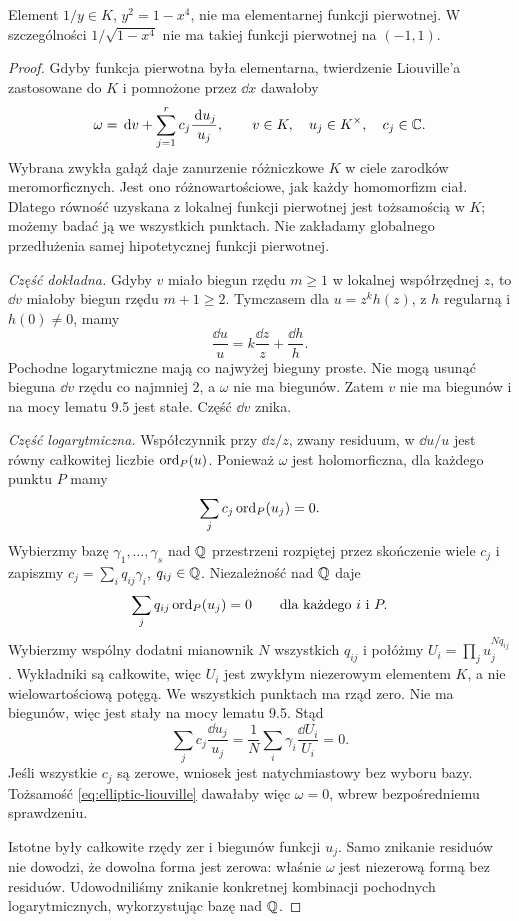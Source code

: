 \begin{twierdzenie}
Element $1/y\in K$, $y^2=1-x^4$, nie ma elementarnej funkcji pierwotnej. W szczególności $1/\sqrt{1-x^4}$ nie ma takiej funkcji pierwotnej na $(-1,1)$.
\end{twierdzenie}
\begin{proof}
Gdyby funkcja pierwotna była elementarna, twierdzenie Liouville'a zastosowane do $K$ i pomnożone przez $\dd x$ dawałoby
\begin{equation}\label{eq:elliptic-liouville}
\omega=\,\mathrm{d} v+\sum_{j=1}^r c_j\frac{\,\mathrm{d} u_j}{u_j},\qquad
v\in K,\quad u_j\in K^\times,\quad c_j\in\mathbb{C}.
\end{equation}
Wybrana zwykła gałąź daje zanurzenie różniczkowe $K$ w ciele zarodków meromorficznych. Jest ono różnowartościowe, jak każdy homomorfizm ciał. Dlatego równość uzyskana z lokalnej funkcji pierwotnej jest tożsamością w $K$; możemy badać ją we wszystkich punktach. Nie zakładamy globalnego przedłużenia samej hipotetycznej funkcji pierwotnej.

\emph{Część dokładna.} Gdyby $v$ miało biegun rzędu $m\ge1$ w lokalnej współrzędnej $z$, to $\dd v$ miałoby biegun rzędu $m+1\ge2$. Tymczasem dla $u=z^k h(z)$, z $h$ regularną i $h(0)\ne0$, mamy
\[
\frac{\dd u}{u}=k\frac{\dd z}{z}+\frac{\dd h}{h}.
\]
Pochodne logarytmiczne mają co najwyżej bieguny proste. Nie mogą usunąć bieguna $\dd v$ rzędu co najmniej $2$, a $\omega$ nie ma biegunów. Zatem $v$ nie ma biegunów i na mocy lematu 9.5 jest stałe. Część $\dd v$ znika.

\emph{Część logarytmiczna.} Współczynnik przy $\dd z/z$, zwany residuum, w $\dd u/u$ jest równy całkowitej liczbie $\operatorname{ord}_P(u)$. Ponieważ $\omega$ jest holomorficzna, dla każdego punktu $P$ mamy
\[
\sum_j c_j\operatorname{ord}_P(u_j)=0.
\]
Wybierzmy bazę $\gamma_1,\dots,\gamma_s$ nad $\mathbb{Q}$ przestrzeni rozpiętej przez skończenie wiele $c_j$ i zapiszmy $c_j=\sum_i q_{ij}\gamma_i$, $q_{ij}\in\mathbb{Q}$. Niezależność nad $\mathbb{Q}$ daje
\[
\sum_j q_{ij}\operatorname{ord}_P(u_j)=0\qquad\text{dla każdego }i\text{ i }P.
\]
Wybierzmy wspólny dodatni mianownik $N$ wszystkich $q_{ij}$ i połóżmy $U_i=\prod_j u_j^{Nq_{ij}}$. Wykładniki są całkowite, więc $U_i$ jest zwykłym niezerowym elementem $K$, a nie wielowartościową potęgą. We wszystkich punktach ma rząd zero. Nie ma biegunów, więc jest stały na mocy lematu 9.5. Stąd
\[
\sum_j c_j\frac{\dd u_j}{u_j}
=\frac1N\sum_i\gamma_i\frac{\dd U_i}{U_i}=0.
\]
Jeśli wszystkie $c_j$ są zerowe, wniosek jest natychmiastowy bez wyboru bazy. Tożsamość \eqref{eq:elliptic-liouville} dawałaby więc $\omega=0$, wbrew bezpośredniemu sprawdzeniu.

Istotne były całkowite rzędy zer i biegunów funkcji $u_j$. Samo znikanie residuów nie dowodzi, że dowolna forma jest zerowa: właśnie $\omega$ jest niezerową formą bez residuów. Udowodniliśmy znikanie konkretnej kombinacji pochodnych logarytmicznych, wykorzystując bazę nad $\mathbb{Q}$.
\end{proof}

